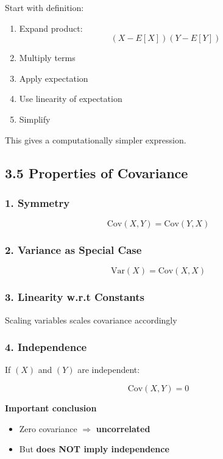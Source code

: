 \documentclass[12pt]{article}
\begin{document}
Start with definition:

\begin{enumerate}
\item Expand product:
\[
(X - E[X])(Y - E[Y])
\]
\item Multiply terms
\item Apply expectation
\item Use linearity of expectation
\item Simplify
\end{enumerate}

This gives a computationally simpler expression.

\subsection*{3.5 Properties of Covariance}

\subsubsection*{1. Symmetry}

\[
\text{Cov}(X,Y) = \text{Cov}(Y,X)
\]

\subsubsection*{2. Variance as Special Case}

\[
\text{Var}(X) = \text{Cov}(X,X)
\]

\subsubsection*{3. Linearity w.r.t Constants}

Scaling variables scales covariance accordingly

\subsubsection*{4. Independence}

If $(X)$ and $(Y)$ are independent:

\[
\text{Cov}(X,Y) = 0
\]

\textbf{Important conclusion}

\begin{itemize}
\item Zero covariance $\Rightarrow$ \textbf{uncorrelated}
\item But \textbf{does NOT imply independence}
\end{itemize}
\end{document}
